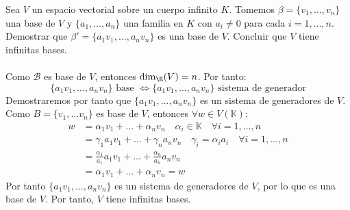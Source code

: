 \begin{ejercicio} Sea \( V \) un espacio vectorial sobre un cuerpo infinito \( K \). Tomemos \( \beta = \{v_1, \ldots, v_n\} \) una base de \( V \) y \( \{a_1, \ldots, a_n\} \) una familia en \( K \) con \( a_i \neq 0 \) para cada \( i = 1, \ldots, n \). Demostrar que \( \beta' = \{a_1v_1, \ldots, a_nv_n\} \) es una base de \( V \). Concluir que \( V \) tiene infinitas bases.
	\\ \\Como $\mathcal{B}$ es base de $V$, entonces $\dim_\R (V) = n$. Por tanto:
	\begin{equation*}
		\{a_1 v_1, \ldots, a_n v_n\} \text{ base } \Leftrightarrow \{a_1 v_1, \ldots, a_n v_n\} \text{ sistema de generador}
	\end{equation*}
	Demostraremos por tanto que $\{a_1 v_1, \ldots, a_n v_n\}$ es un sistema de generadores de $V$. Como
	$B = \{ v_1, \ldots v_n \}$ es base de $V$, entonces $\forall w \in V(\mathbb{K})$:
	\begin{align*}
		w & = \alpha_1 v_1 + \ldots + \alpha_n v_n \quad \alpha_i \in \mathbb{K} \quad \forall i = 1, \ldots, n         \\
		  & = \gamma_1 a_1 v_1 + \ldots + \gamma_n a_n v_n \quad \gamma_i = \alpha_i a_i \quad \forall i = 1, \ldots, n \\
		  & = \frac{\alpha_1}{a_1} a_1 v_1 + \ldots + \frac{\alpha_n}{a_n} a_n v_n                                      \\
		  & = \alpha_1 v_1 + \ldots + \alpha_n v_n = w
	\end{align*}
	Por tanto $\{a_1 v_1, \ldots, a_n v_n\}$ es un sistema de generadores de $V$, por lo que es una base de $V$. Por tanto, $V$ tiene infinitas bases.
\end{ejercicio}


